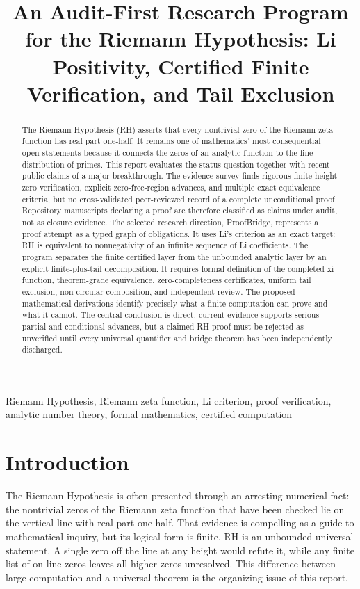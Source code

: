 \documentclass[conference]{../../../../Conference-LaTeX-template_10-17-19/IEEEtran}
\title{An Audit-First Research Program for the Riemann Hypothesis: Li Positivity, Certified Finite Verification, and Tail Exclusion}
\author{\IEEEauthorblockN{Research Proposal}\IEEEauthorblockA{Evidence-bounded four-agent synthesis | Mathematical design only}}
\begin{document}
\maketitle
\begin{abstract}
The Riemann Hypothesis (RH) asserts that every nontrivial zero of the Riemann zeta function has real part one-half. It remains one of mathematics' most consequential open statements because it connects the zeros of an analytic function to the fine distribution of primes. This report evaluates the status question together with recent public claims of a major breakthrough. The evidence survey finds rigorous finite-height zero verification, explicit zero-free-region advances, and multiple exact equivalence criteria, but no cross-validated peer-reviewed record of a complete unconditional proof. Repository manuscripts declaring a proof are therefore classified as claims under audit, not as closure evidence. The selected research direction, ProofBridge, represents a proof attempt as a typed graph of obligations. It uses Li's criterion as an exact target: RH is equivalent to nonnegativity of an infinite sequence of Li coefficients. The program separates the finite certified layer from the unbounded analytic layer by an explicit finite-plus-tail decomposition. It requires formal definition of the completed xi function, theorem-grade equivalence, zero-completeness certificates, uniform tail exclusion, non-circular composition, and independent review. The proposed mathematical derivations identify precisely what a finite computation can prove and what it cannot. The central conclusion is direct: current evidence supports serious partial and conditional advances, but a claimed RH proof must be rejected as unverified until every universal quantifier and bridge theorem has been independently discharged.
\end{abstract}
\begin{IEEEkeywords}
Riemann Hypothesis, Riemann zeta function, Li criterion, proof verification, analytic number theory, formal mathematics, certified computation
\end{IEEEkeywords}

\section{Introduction}
The Riemann Hypothesis is often presented through an arresting numerical fact: the nontrivial zeros of the Riemann zeta function that have been checked lie on the vertical line with real part one-half. That evidence is compelling as a guide to mathematical inquiry, but its logical form is finite. RH is an unbounded universal statement. A single zero off the line at any height would refute it, while any finite list of on-line zeros leaves all higher zeros unresolved. This difference between large computation and a universal theorem is the organizing issue of this report.
\end{document}
